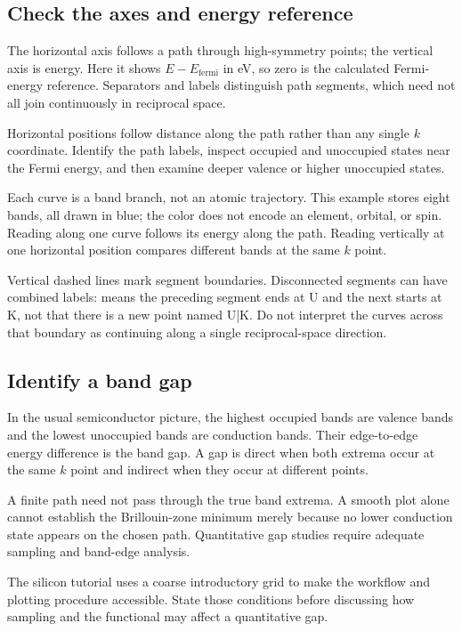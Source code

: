 \subsection{Check the axes and energy reference}

The horizontal axis follows a path through high-symmetry points; the vertical axis is energy. Here it shows $E-E_{\mathrm{fermi}}$ in eV, so zero is the calculated Fermi-energy reference. Separators and labels distinguish path segments, which need not all join continuously in reciprocal space.

Horizontal positions follow distance along the path rather than any single $k$ coordinate. Identify the path labels, inspect occupied and unoccupied states near the Fermi energy, and then examine deeper valence or higher unoccupied states.

Each curve is a band branch, not an atomic trajectory. This example stores eight bands, all drawn in blue; the color does not encode an element, orbital, or spin. Reading along one curve follows its energy along the path. Reading vertically at one horizontal position compares different bands at the same $k$ point.

Vertical dashed lines mark segment boundaries. Disconnected segments can have combined labels:  means the preceding segment ends at U and the next starts at K, not that there is a new point named U|K. Do not interpret the curves across that boundary as continuing along a single reciprocal-space direction.

\subsection{Identify a band gap}

In the usual semiconductor picture, the highest occupied bands are valence bands and the lowest unoccupied bands are conduction bands. Their edge-to-edge energy difference is the band gap. A gap is direct when both extrema occur at the same $k$ point and indirect when they occur at different points.

A finite path need not pass through the true band extrema. A smooth plot alone cannot establish the Brillouin-zone minimum merely because no lower conduction state appears on the chosen path. Quantitative gap studies require adequate sampling and band-edge analysis.

The silicon tutorial uses a coarse introductory grid to make the workflow and plotting procedure accessible. State those conditions before discussing how sampling and the functional may affect a quantitative gap.

